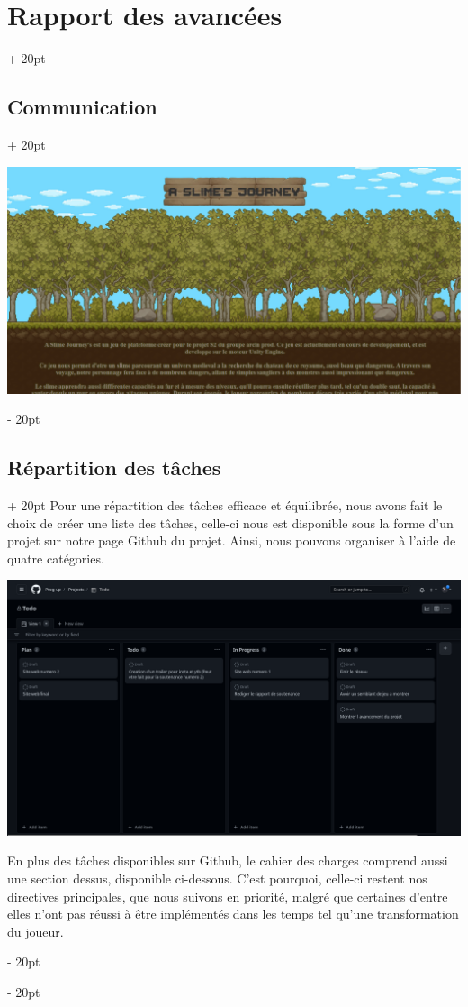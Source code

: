 \documentclass[a4paper, 12pt, twoside]{article}
\newcommand{\ind}[1][20pt]{\advance\leftskip + #1}
\newcommand{\deind}[1][20pt]{\advance\leftskip - #1}
\newenvironment{indt}[2][20pt]{#2 \par \ind[#1]}{\par \deind} %
\begin{document}
\begin{indt}{\section{Rapport des avancées}}
\begin{indt}{\subsection{Communication}}
            \begin{center}
                \includegraphics[width=0.8\linewidth]{Site.png}
            \end{center}
        \end{indt}

        \begin{indt}{\subsection{Répartition des tâches}}
            Pour une répartition des tâches efficace et équilibrée, nous avons fait le choix de créer une liste des tâches, celle-ci nous est disponible sous la forme d'un projet sur notre page Github du projet. Ainsi, nous pouvons organiser à l'aide de quatre catégories.
        
            \begin{center}
                \includegraphics[width=0.8\linewidth]{EDT.png}
            \end{center}

            En plus des tâches disponibles sur Github, le cahier des charges comprend aussi une section dessus, disponible ci-dessous. C'est pourquoi, celle-ci restent nos directives principales, que nous suivons en priorité, malgré que certaines d'entre elles n'ont pas réussi à être implémentés dans les temps tel qu'une transformation du joueur.
        \end{indt}


\end{indt}
\end{document}
